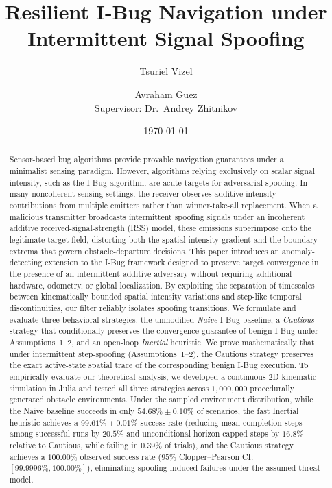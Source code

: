 \documentclass[12pt, a4paper]{article}
\title{Resilient I-Bug Navigation under Intermittent Signal Spoofing}
\author{
  Tsuriel Vizel \and Avraham Guez \\[1ex]
  \small Supervisor: Dr.\ Andrey Zhitnikov
}
\date{\today}
\begin{document}
\maketitle

\begin{abstract}
Sensor-based bug algorithms provide provable navigation guarantees under a minimalist sensing paradigm. However, algorithms relying exclusively on scalar signal intensity, such as the I-Bug algorithm, are acute targets for adversarial spoofing. In many noncoherent sensing settings, the receiver observes additive intensity contributions from multiple emitters rather than winner-take-all replacement. When a malicious transmitter broadcasts intermittent spoofing signals under an incoherent additive received-signal-strength (RSS) model, these emissions superimpose onto the legitimate target field, distorting both the spatial intensity gradient and the boundary extrema that govern obstacle-departure decisions. This paper introduces an anomaly-detecting extension to the I-Bug framework designed to preserve target convergence in the presence of an intermittent additive adversary without requiring additional hardware, odometry, or global localization. By exploiting the separation of timescales between kinematically bounded spatial intensity variations and step-like temporal discontinuities, our filter reliably isolates spoofing transitions. We formulate and evaluate three behavioral strategies: the unmodified \textit{Naive} I-Bug baseline, a \textit{Cautious} strategy that conditionally preserves the convergence guarantee of benign I-Bug under Assumptions~1--2, and an open-loop \textit{Inertial} heuristic. We prove mathematically that under intermittent step-spoofing (Assumptions~1--2), the Cautious strategy preserves the exact active-state spatial trace of the corresponding benign I-Bug execution. To empirically evaluate our theoretical analysis, we developed a continuous 2D kinematic simulation in Julia and tested all three strategies across $1,000,000$ procedurally generated obstacle environments. Under the sampled environment distribution, while the Naive baseline succeeds in only $54.68\% \pm 0.10\%$ of scenarios, the fast Inertial heuristic achieves a $99.61\% \pm 0.01\%$ success rate (reducing mean completion steps among successful runs by $20.5\%$ and unconditional horizon-capped steps by $16.8\%$ relative to Cautious, while failing in $0.39\%$ of trials), and the Cautious strategy achieves a $100.00\%$ observed success rate ($95\%$ Clopper--Pearson CI: $[99.9996\%, 100.00\%]$), eliminating spoofing-induced failures under the assumed threat model.
\end{abstract}
\end{document}
